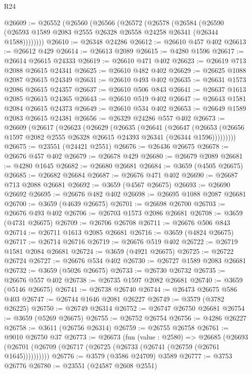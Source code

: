 \begin{lexlean}{R24}
\begin{coremodule}
@26609 := @26552
    (@26560
      (@26566
        (@26572
          (@26578
            (@26584
              (@26590 (@26593 @1589 @2083 @2555 @26328 @26558 @24258 @26341 (@26344 @1588))))))))
@26610 := @26348 @24286
@26612 := @26610 @457 @402
@26613 := @26612 @429
@26614 := @26613 @2089
@26615 := @4280 @1596
@26617 := @26614 @26615 @24333
@26619 := @26610 @471 @402
@26623 := @26619 @713 @2088 @26615 @24341
@26625 := @26610 @482 @402
@26629 := @26625 @1088 @2087 @26615 @24349
@26631 := @26610 @493 @402
@26635 := @26631 @1573 @2086 @26615 @24357
@26637 := @26610 @506 @843
@26641 := @26637 @1613 @2085 @26615 @24365
@26643 := @26610 @519 @402
@26647 := @26643 @1581 @2084 @26615 @24373
@26649 := @26610 @534 @402
@26653 := @26649 @1589 @2083 @26615 @24381
@26656 := @26329 @24286 @557 @402
@26673 := @26609
    (@26617
      (@26623
        (@26629
          (@26635
            (@26641
              (@26647
                (@26653 (@26656 @1597 @2082 @2555 @26328 @26615 @24393 @26341 (@26344 @1596)))))))))
@26675 := @23551 (@24421 @2551)
@26676 := @26436 @26675
@26678 := @26676 @457 @402
@26679 := @26678 @429
@26680 := @26679 @2089
@26681 := @4280 @1645
@26682 := @26680 @26681
@26684 := @3659 (@4505 @26675)
@26685 := @26682 @26684
@26687 := @26676 @471 @402
@26690 := @26687 @713 @2088 @26681
@26692 := @3659 (@4567 @26675)
@26693 := @26690 @26692
@26695 := @26676 @482 @402
@26698 := @26695 @1088 @2087 @26681
@26700 := @3659 (@4639 @26675)
@26701 := @26698 @26700
@26703 := @26676 @493 @402
@26706 := @26703 @1573 @2086 @26681
@26708 := @3659 (@4731 @26675)
@26709 := @26706 @26708
@26711 := @26676 @506 @843
@26714 := @26711 @1613 @2085 @26681
@26716 := @3659 (@4824 @26675)
@26717 := @26714 @26716
@26719 := @26676 @519 @402
@26722 := @26719 @1581 @2084 @26681
@26724 := @3659 (@4921 @26675)
@26725 := @26722 @26724
@26727 := @26676 @534 @402
@26730 := @26727 @1589 @2083 @26681
@26732 := @3659 (@5026 @26675)
@26733 := @26730 @26732
@26735 := @26676 @557 @402
@26738 := @26735 @1597 @2082 @26681
@26740 := @3659 (@5146 @26675)
@26741 := @26738 @26740
@26744 := @26473 @26675 @586 @403
@26747 := @26744 @1646 @2081 @26227
@26749 := @3579 (@3782 @26225)
@26750 := @26749 @26314
@26752 := @26747 @26750 @26681
@26754 := @3659 (@5269 @26675)
@26755 := @26752 @26754
@26756 := @4286 @26227
@26758 := @3611 (@26756 @26314)
@26759 := @26755 @26758
@26761 := @9010 @26750 @37
@26773 := @26673
    (fun (value : @2580) =>
    @26685 (@26693 (@26701 (@26709 (@26717 (@26725 (@26733 (@26741 (@26759 (@26761 @1645))))))))))
@26776 := @3579 (@3586 @24709) @3589
@26777 := @3753 @26776
@26780 := @23551 (@24587 @2608 @2551)

\end{coremodule}
\end{lexlean}
